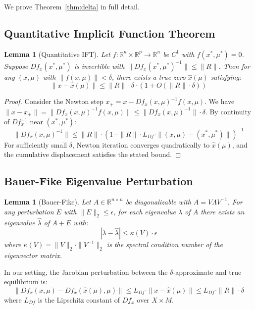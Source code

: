 \documentclass[11pt]{article}
\newtheorem{lemma}[theorem]{Lemma}
\newcommand{\R}{\mathbb{R}}
\newcommand{\norm}[1]{\|#1\|}
\begin{document}
We prove Theorem~\ref{thm:delta} in full detail.

\subsection{Quantitative Implicit Function Theorem}

\begin{lemma}[Quantitative IFT]
\label{lem:quantitative-ift}
Let $f: \R^n \times \R^p \to \R^n$ be $C^1$ with $f(x^*, \mu^*) = 0$.
Suppose $Df_x(x^*, \mu^*)$ is invertible with $\norm{Df_x(x^*, \mu^*)^{-1}} \leq \norm{R}$.
Then for any $(x, \mu)$ with $\norm{f(x, \mu)} < \delta$, there exists a true zero $\hat{x}(\mu)$ satisfying:
\[
\norm{x - \hat{x}(\mu)} \leq \norm{R} \cdot \delta \cdot (1 + O(\norm{R} \cdot \delta))
\]
\end{lemma}

\begin{proof}
Consider the Newton step $x_{+} = x - Df_x(x, \mu)^{-1} f(x, \mu)$.
We have $\norm{x - x_{+}} = \norm{Df_x(x, \mu)^{-1} f(x, \mu)} \leq \norm{Df_x(x, \mu)^{-1}} \cdot \delta$.
By continuity of $Df_x^{-1}$ near $(x^*, \mu^*)$:
\[
\norm{Df_x(x, \mu)^{-1}} \leq \norm{R} \cdot (1 - \norm{R} \cdot L_{Df} \cdot \norm{(x, \mu) - (x^*, \mu^*)})^{-1}
\]
For sufficiently small $\delta$, Newton iteration converges quadratically to $\hat{x}(\mu)$, and the cumulative displacement satisfies the stated bound.
\end{proof}

\subsection{Bauer-Fike Eigenvalue Perturbation}

\begin{lemma}[Bauer-Fike]
\label{lem:bauer-fike}
Let $A \in \R^{n \times n}$ be diagonalizable with $A = V \Lambda V^{-1}$.
For any perturbation $E$ with $\norm{E}_2 \leq \epsilon$, for each eigenvalue $\lambda$ of $A$ there exists an eigenvalue $\hat{\lambda}$ of $A + E$ with:
\[
|\lambda - \hat{\lambda}| \leq \kappa(V) \cdot \epsilon
\]
where $\kappa(V) = \norm{V}_2 \cdot \norm{V^{-1}}_2$ is the spectral condition number of the eigenvector matrix.
\end{lemma}

In our setting, the Jacobian perturbation between the $\delta$-approximate and true equilibrium is:
\[
\norm{Df_x(x, \mu) - Df_x(\hat{x}(\mu), \mu)} \leq L_{Df} \cdot \norm{x - \hat{x}(\mu)} \leq L_{Df} \cdot \norm{R} \cdot \delta
\]
where $L_{Df}$ is the Lipschitz constant of $Df_x$ over $X \times M$.
\end{document}

